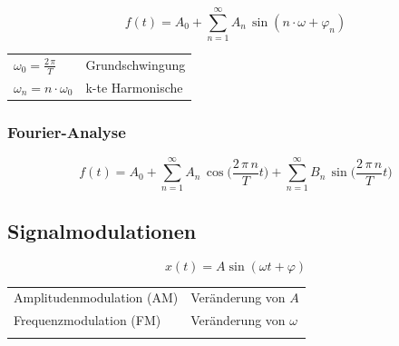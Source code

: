 $$ \boxed{ f(t) = A_0 + \sum\limits_{n=1}^{\infty}  A_n \, \sin(n \cdot \omega + \varphi_n)  } $$

\begin{tabular}{ll}
$\omega_0 = \frac{2 \, \pi}{T}$ & Grundschwingung \\
$\omega_n = n \cdot \omega_0$ & k-te Harmonische \\
\end{tabular}



\subsubsection{Fourier-Analyse}

$$ \boxed{ f(t) = A_0 +  \sum\limits_{n=1}^{\infty}  A_n \, \cos  \Big(\frac{ 2 \, \pi \, n}{T} t \Big) + \sum\limits_{n=1}^{\infty}  B_n \, \sin \Big(\frac{ 2 \, \pi \, n}{T} t \Big)  } $$

\begin{minipage}{0.6\linewidth}
\end{minipage}
\hfill
\begin{minipage}{0.33\linewidth}
\end{minipage}


\begin{minipage}{0.6\linewidth}
\end{minipage}
\hfill
\begin{minipage}{0.33\linewidth}

\end{minipage}





\subsection{Signalmodulationen}

$$ \boxed{ x(t) = A \sin ( \omega t + \varphi)} $$ 

\begin{tabular}{ll}
Amplitudenmodulation (AM) & Veränderung von $ A $ \\
Frequenzmodulation (FM) & Veränderung von $ \omega $ \\
\\
\end{tabular}

